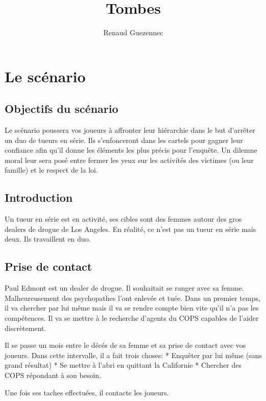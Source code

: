 \documentclass[10pt,a5paper,oneside]{book}
\author{Renaud Guezennec}
\title{Tombes}
\begin{document}
\maketitle \clearpage
\tableofcontents \clearpage
\listoffigures \clearpage


\chapter{Le scénario}


\section{Objectifs du scénario}

Le scénario poussera vos joueurs à affronter leur hiérarchie dans le but d’arrêter un duo de tueurs en série. Ils s’enfonceront dans les cartels pour gagner leur 
confiance afin qu'il donne les éléments les plus précis pour l’enquête. Un dilemne moral leur sera posé entre fermer les yeux sur les activités des victimes (ou leur famille) et le respect de la loi. 

\section{Introduction}

Un tueur en série est en activité, ses cibles sont des femmes autour des gros dealers de drogue de Los Angeles.
En réalité, ce n'est pas un tueur en série mais deux. Ils travaillent en duo.

\section{Prise de contact}

Paul Edmont est un dealer de drogue. Il souhaitait se ranger avec sa femme. 
Malheureusement des psychopathes l'ont enlevée et tuée. Dans un premier temps, il va chercher par lui même mais il va se rendre compte bien vite qu'il n'a pas les compétences. 
Il va se mettre à le recherche d’agents du COPS capables de l'aider discrètement.

Il se passe un mois entre le décés de sa femme et sa prise de contact avec vos joueurs. 
Dans cette intervalle, il a fait trois choses:
* Enquêter par lui même (sans grand résultat)
* Se mettre à l’abri en quittant la Californie
* Chercher des COPS répondant à son besoin.

Une fois ses taches effectuées, il contacte les joueurs.
\end{document}
